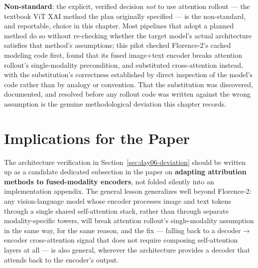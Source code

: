 \textbf{Non-standard}: the explicit, verified decision \emph{not} to use attention rollout --- the
textbook ViT XAI method the plan originally specified --- is the non-standard, and reportable,
choice in this chapter. Most pipelines that adopt a planned method do so without re-checking
whether the target model's actual architecture satisfies that method's assumptions; this pilot
checked Florence-2's cached modeling code first, found that its fused image+text encoder breaks
attention rollout's single-modality precondition, and substituted cross-attention instead, with
the substitution's correctness established by direct inspection of the model's code rather than
by analogy or convention. That the substitution was discovered, documented, and resolved before
any rollout code was written against the wrong assumption is the genuine methodological
deviation this chapter records.

\section{Implications for the Paper}
\label{sec:day06-implications}

The architecture verification in Section~\ref{sec:day06-deviation} should be written up as a
candidate dedicated subsection in the paper on \textbf{adapting attribution methods to
fused-modality encoders}, not folded silently into an implementation appendix. The general lesson
generalizes well beyond Florence-2: any vision-language model whose encoder processes image and
text tokens through a single shared self-attention stack, rather than through separate
modality-specific towers, will break attention rollout's single-modality assumption in the same
way, for the same reason, and the fix --- falling back to a decoder$\to$encoder cross-attention
signal that does not require composing self-attention layers at all --- is also general, wherever
the architecture provides a decoder that attends back to the encoder's output.

